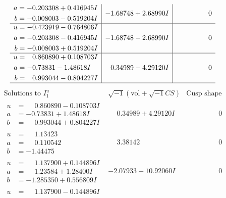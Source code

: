 \documentclass[1p]{elsarticle_modified}
\theoremstyle{definition}
\newcommand{\I}{\sqrt{-1}}
\begin{document}
$$\begin{array}{c|c|c}
\begin{aligned}
a &= -0.203308 + 0.416945 I \\
b &= -0.008003 - 0.519204 I\end{aligned}
 & -1.68748 + 2.68990 I & \phantom{-0.000000 } 0 \\ \hline\begin{aligned}
u &= -0.423919 - 0.764806 I \\
a &= -0.203308 - 0.416945 I \\
b &= -0.008003 + 0.519204 I\end{aligned}
 & -1.68748 - 2.68990 I & \phantom{-0.000000 } 0 \\ \hline\begin{aligned}
u &= \phantom{-}0.860890 + 0.108703 I \\
a &= -0.73831 - 1.48618 I \\
b &= \phantom{-}0.993044 - 0.804227 I\end{aligned}
 & \phantom{-}0.34989 - 4.29120 I & \phantom{-0.000000 } 0\\
 \hline 
 \end{array}$$\newpage$$\begin{array}{c|c|c}  
\text{Solutions to }I^u_{1}& \I (\text{vol} + \sqrt{-1}CS) & \text{Cusp shape}\\
 \hline 
\begin{aligned}
u &= \phantom{-}0.860890 - 0.108703 I \\
a &= -0.73831 + 1.48618 I \\
b &= \phantom{-}0.993044 + 0.804227 I\end{aligned}
 & \phantom{-}0.34989 + 4.29120 I & \phantom{-0.000000 } 0 \\ \hline\begin{aligned}
u &= \phantom{-}1.13423\phantom{ +0.000000I} \\
a &= \phantom{-}0.110542\phantom{ +0.000000I} \\
b &= -1.44475\phantom{ +0.000000I}\end{aligned}
 & \phantom{-}3.38142\phantom{ +0.000000I} & \phantom{-0.000000 } 0 \\ \hline\begin{aligned}
u &= \phantom{-}1.137900 + 0.144896 I \\
a &= \phantom{-}1.23584 + 1.28400 I \\
b &= -1.285350 + 0.556809 I\end{aligned}
 & -2.07933 - 10.92060 I & \phantom{-0.000000 } 0 \\ \hline\begin{aligned}
u &= \phantom{-}1.137900 - 0.144896 I \\

\end{aligned}
\end{array}$$
\end{document}
